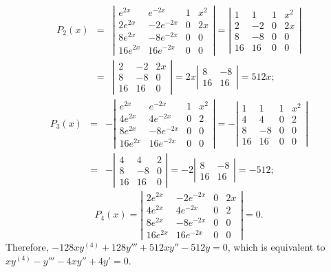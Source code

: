 \documentclass[dvips]{book}
\numberwithin{example}{section}
\numberwithin{equation}{section}
\numberwithin{theorem}{section}
\numberwithin{table}{section}
\numberwithin{figure}{section}
\begin{document}
\begin{eqnarray*}
P_2(x)&=&
\left|\begin{array}{crcc}
e^{2x}&e^{-2x}&1&x^2\\
2e^{2x}&-2e^{-2x}&0&2x\\
8e^{2x}&-8e^{-2x}&0&0\\
16e^{2x}&16e^{-2x}&0&0
\end{array}\right|=
\left|\begin{array}{crcc}
1&1&1&x^2\\
2&-2&0&2x\\
8&-8&0&0\\
16&16&0&0
\end{array}\right|\\
&=&\left|\begin{array}{crcc}
2&-2&2x\\
8&-8&0\\
16&16&0
\end{array}\right|
=2x\left|\begin{array}{crcc}
8&-8\\
16&16
\end{array}\right|=512x;
\end{eqnarray*}
\begin{eqnarray*}
P_3(x)&=&
-\left|\begin{array}{cccc}
e^{2x}&e^{-2x}&1&x^2\\
4e^{2x}&4e^{-2x}&0&2\\
8e^{2x}&-8e^{-2x}&0&0\\
16e^{2x}&16e^{-2x}&0&0
\end{array}\right|=
-\left|\begin{array}{crcc}
1&1&1&x^2\\
4&4&0&2\\
8&-8&0&0\\
16&16&0&0
\end{array}\right|\\
&=&-\left|\begin{array}{crcc}
4&4&2\\
8&-8&0\\
16&16&0
\end{array}\right|
=-2\left|\begin{array}{crcc}
8&-8\\
16&16
\end{array}\right|=-512;
\end{eqnarray*}
$$
P_4(x)=
\left|\begin{array}{crcc}
2e^{2x}&-2e^{-2x}&0&2x\\
4e^{2x}&4e^{-2x}&0&2\\
8e^{2x}&-8e^{-2x}&0&0\\
16e^{2x}&16e^{-2x}&0&0
\end{array}\right|=0.
$$
Therefore,
$-128xy^{(4)}+128y'''+512xy''-512y=0$,
which is equivalent to
 $xy^{(4)}-y'''-4xy''+4y'=0$.
\end{document}
